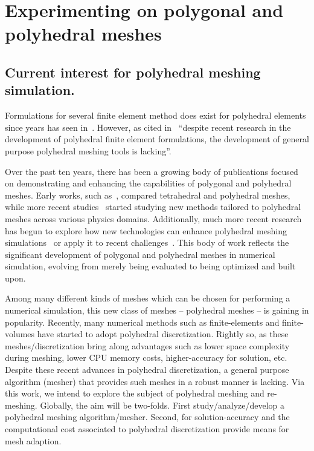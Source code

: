 \documentclass{article}
\begin{document}
\section{Experimenting on polygonal and polyhedral meshes}

\subsection{Current interest for polyhedral meshing simulation.}
Formulations for several finite element method does exist for polyhedral elements since years has seen in~\cite{rashid2006three,bishop2014displacement,gain2014virtual}. However, as cited in~\cite{bishop2020polyhedral} ``despite recent research in the development of polyhedral finite element formulations, the development of general purpose polyhedral meshing tools is lacking''.

Over the past ten years, there has been a growing body of publications focused on demonstrating and enhancing the capabilities of polygonal and polyhedral meshes. Early works, such as~\cite{spiegel2011tetrahedral}, compared tetrahedral and polyhedral meshes, while more recent studies~\cite{vacca2017virtual,lipnikov2011mimetic,antonietti2018high} started studying new methods tailored to polyhedral meshes across various physics domains. Additionally, much more recent research has begun to explore how new technologies can enhance polyhedral meshing simulations~\cite{antonietti2022machine} or apply it to recent challenges~\cite{LI2024111846}. This body of work reflects the significant development of polygonal and polyhedral meshes in numerical simulation, evolving from merely being evaluated to being optimized and built upon.

Among many different kinds of meshes which can be chosen for performing a numerical simulation, this new class of meshes – polyhedral meshes – is gaining in popularity. Recently, many numerical methods such as finite-elements and finite-volumes have started to adopt polyhedral discretization. Rightly so, as these meshes/discretization bring along advantages such as lower space complexity during meshing, lower CPU memory costs, higher-accuracy for solution, etc. Despite these recent advances in polyhedral discretization, a general purpose algorithm (mesher) that provides such meshes in a robust manner is lacking. Via this work, we intend to explore the subject of polyhedral meshing and re-meshing. Globally, the aim will be two-folds. First study/analyze/develop a polyhedral meshing algorithm/mesher. Second, for solution-accuracy and the computational cost associated to polyhedral discretization provide means for mesh adaption.
\end{document}
